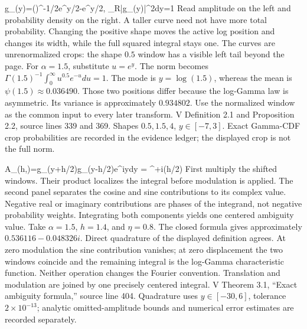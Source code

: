
{g_\alpha(y)=\Gamma(\alpha)^{-1/2}e^{\alpha y/2-e^y/2},\qquad
 \int_{\mathbb R}|g_\alpha(y)|^2dy=1}
{Read amplitude on the left and probability density on the right. A taller curve
need not have more total probability. Changing the positive shape moves the
active log position and changes its width, while the full squared integral
stays one. The curves are unrenormalized crops: the shape $0.5$ window has a
visible left tail beyond the page.}
{For $\alpha=1.5$, substitute $u=e^y$. The norm becomes
$\Gamma(1.5)^{-1}\int_0^\infty u^{0.5}e^{-u}du=1$.
The mode is $y=\log(1.5)$, whereas the mean is
$\psi(1.5)\approx0.036490$. Those two positions differ because the
log-Gamma law is asymmetric. Its variance is approximately $0.934802$.}
{Use the normalized window as the common input to every later transform.}
{V Definition 2.1 and Proposition 2.2, source lines 339 and 369. Shapes
$0.5,1.5,4$, $y\in[-7,3]$. Exact Gamma-CDF crop probabilities are recorded in
the evidence ledger; the displayed crop is not the full norm.}

{A_\alpha(h,\eta)=\int g_\alpha(y+h/2)g_\alpha(y-h/2)e^{i\eta y}dy
 =
 ^{\alpha+i\eta}(h/2)}
{First multiply the shifted windows. Their product localizes the integral
before modulation is applied. The second panel separates the cosine and sine
contributions to its complex value. Negative real or imaginary contributions
are phases of the integrand, not negative probability weights. Integrating both
components yields one centered ambiguity value.}
{Take $\alpha=1.5$, $h=1.4$, and $\eta=0.8$. The closed formula gives
approximately $0.536116-0.048326i$. Direct quadrature of the displayed
definition agrees. At zero modulation the sine contribution vanishes; at zero
displacement the two windows coincide and the remaining integral is the
log-Gamma characteristic function. Neither operation changes the Fourier
convention.}
{Translation and modulation are joined by one precisely centered integral.}
{V Theorem 3.1, ``Exact ambiguity formula,'' source line 404. Quadrature uses
$y\in[-30,6]$, tolerance $2\times10^{-13}$; analytic omitted-amplitude bounds
and numerical error estimates are recorded separately.}

